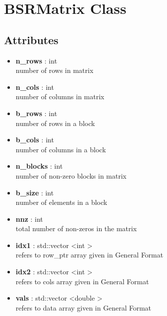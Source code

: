 \documentclass{article}
\newcommand\tab[1][1cm]{\hspace*{#1}}
\begin{document}
\section*{BSRMatrix Class}

\subsection*{Attributes}
    \begin{itemize}
        \item \textbf{n\_rows} : int \\
            \tab    number of rows in matrix
        \item \textbf{n\_cols} : int \\
            \tab    number of columns in matrix
        \item \textbf{b\_rows} : int \\
            \tab    number of rows in a block
        \item \textbf{b\_cols} : int \\
            \tab    number of columns in a block
        \item \textbf{n\_blocks} : int \\
            \tab    number of non-zero blocks in matrix
        \item \textbf{b\_size} : int \\
            \tab    number of elements in a block
        \item \textbf{nnz} : int \\
            \tab    total number of non-zeros in the matrix
        \item \textbf{idx1} : std::vector \textless int \textgreater \\
            \tab    refers to row\_ptr array given in General Format
        \item \textbf{idx2} : std::vector \textless int \textgreater \\
            \tab    refers to cols array given in General Format
        \item \textbf{vals} : std::vector \textless double \textgreater \\
            \tab    refers to data array given in General Format
    \end{itemize}
\end{document}
